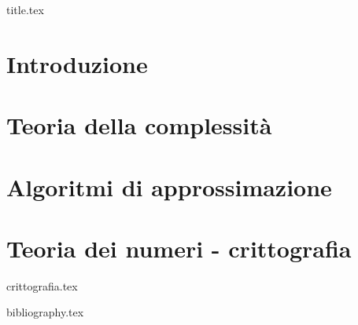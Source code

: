 \documentclass[a4paper,11pt,oneside]{book}
\begin{document}

\frontmatter

{title.tex}

\tableofcontents

\mainmatter


\chapter{Introduzione}

\chapter{Teoria della complessità}

\chapter{Algoritmi di approssimazione}

\chapter{Teoria dei numeri - crittografia}
{crittografia.tex}

\cleardoublepage

{bibliography.tex}
\end{document}

